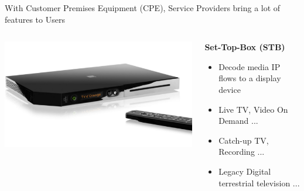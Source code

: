 \documentclass[a4paper]{beamer}
\begin{document}
\begin{frame}{With Customer Premises Equipment (CPE), Service Providers bring a lot of features to Users}
												
	\begin{columns}[T] 
		\begin{column}[T]{0.25 \textwidth} 
			\includegraphics[width=\linewidth]{liveboxdec.png}
		\end{column}
																										
		\begin{column}[T]{0.75 \textwidth} %
																																							
																																								   
			\textbf{ Set-Top-Box (STB)}
			\begin{itemize}
				\item Decode media IP flows to a display device
				\item Live TV, Video On Demand ...
				\item Catch-up TV, Recording ...
				\item Legacy Digital terrestrial television ...
			\end{itemize}
																																								     
																																							
		\end{column}
																										
	\end{columns}
													
													
													
\end{frame}

\end{document}
